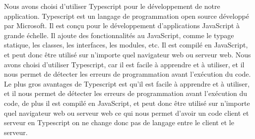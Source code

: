 Nous avons choisi d'utiliser Typescript pour le développement de notre
application. Typescript est un langage de programmation open source développé
par Microsoft. Il est conçu pour le développement d'applications JavaScript
à grande échelle. Il ajoute des fonctionnalités au JavaScript, comme le typage
statique, les classes, les interfaces, les modules, etc. Il est compilé en
JavaScript, et peut donc être utilisé sur n'importe quel navigateur web ou
serveur web. Nous avons choisi d'utiliser Typescript, car il est facile à
apprendre et à utiliser, et il nous permet de détecter les erreurs de
programmation avant l'exécution du code.
Le plus gros avantages de Typescript est qu'il est facile à apprendre et à
utiliser, et il nous permet de détecter les erreurs de programmation avant
l'exécution du code, de plus il est compilé en JavaScript, et peut donc être
utilisé sur n'importe quel navigateur web ou serveur web ce qui nous permet d'avoir un
code client et serveur en Typescript on ne change donc pas de langage entre le 
client et le serveur.
